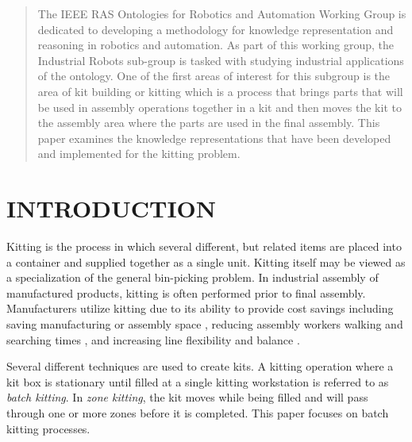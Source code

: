 






\maketitle
\thispagestyle{empty}
\pagestyle{empty}


\begin{abstract}

The IEEE RAS Ontologies for Robotics and Automation Working Group is dedicated to developing a methodology for knowledge representation and reasoning in robotics and automation. As part of this working group, the Industrial Robots sub-group is tasked with studying industrial applications of the ontology. One of the first areas of interest for this subgroup is the area of kit building or kitting which is a process that brings parts that will be used in assembly operations together in a kit and then moves the kit to the assembly area where the parts are used in the final assembly. This paper examines the knowledge representations that have been developed and implemented for the kitting problem.

\end{abstract}


\section{INTRODUCTION}
Kitting is the process in which several different, but related items are placed into a container and supplied together as a single unit.
Kitting itself may be viewed as a specialization of the general bin-picking problem.
In industrial assembly of manufactured products, kitting is often performed prior to final assembly. Manufacturers utilize kitting
due to its ability to provide cost savings \cite{Carlsson_2008} including saving manufacturing or assembly space \cite{Medbo2003}, reducing assembly workers walking and searching times \cite{Schwind1992}, and increasing line flexibility \cite{Bozer1992} and balance \cite{Jiao2000}.

Several different techniques are used to create kits. A kitting operation where a kit box is stationary until filled at a single
kitting workstation is referred to as {\it batch kitting}. In {\it zone kitting}, the kit moves while being filled and will pass through one or
more zones before it is completed. This paper focuses on batch kitting processes.

